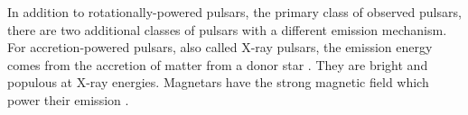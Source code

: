 In addition to rotationally-powered pulsars, the primary class of observed
pulsars, there are two additional classes of pulsars with a different
emission mechanism.  For accretion-powered pulsars, also called X-ray
pulsars, the emission energy comes from the accretion of matter from a
donor star \citep{caballero_2012a_x-ray-pulsars:}.  They are bright and
populous at X-ray energies.  Magnetars have the strong magnetic field
which power their emission \cite{rea_2011a_magnetar-outbursts:}.
